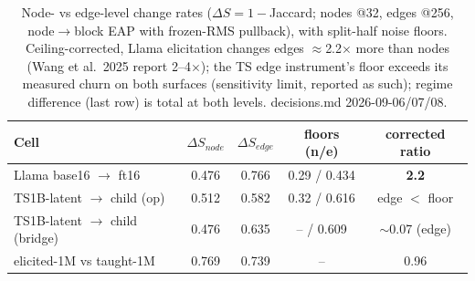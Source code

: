 \begin{table}[t]
\centering
\begin{tabular}{lcccc}
\hline
Cell & $\Delta S_{node}$ & $\Delta S_{edge}$ & floors (n/e) & corrected ratio \\
\hline
Llama base16 $\to$ ft16 & 0.476 & 0.766 & 0.29 / 0.434 & \textbf{2.2} \\
TS1B-latent $\to$ child (op) & 0.512 & 0.582 & 0.32 / 0.616 & edge $<$ floor \\
TS1B-latent $\to$ child (bridge) & 0.476 & 0.635 & -- / 0.609 & $\sim$0.07 (edge) \\
elicited-1M vs taught-1M & 0.769 & 0.739 & -- & 0.96 \\
\hline
\end{tabular}
\caption{Node- vs edge-level change rates ($\Delta S = 1-$Jaccard; nodes @32, edges @256, node$\to$block EAP with frozen-RMS pullback), with split-half noise floors. Ceiling-corrected, Llama elicitation changes edges $\approx$2.2$\times$ more than nodes (Wang et al.\ 2025 report 2--4$\times$); the TS edge instrument's floor exceeds its measured churn on both surfaces (sensitivity limit, reported as such); regime difference (last row) is total at both levels. decisions.md 2026-09-06/07/08.}
\label{tab:delta_s}
\end{table}
